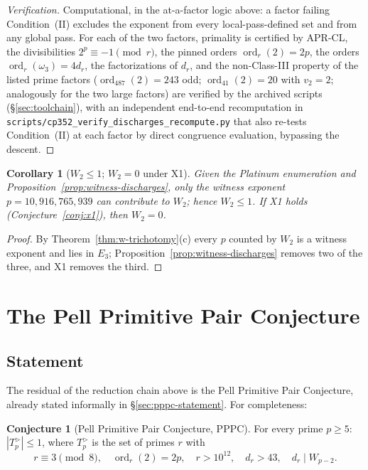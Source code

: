 \documentclass[11pt]{amsart}
\theoremstyle{plain}
\newtheorem{corollary}[theorem]{Corollary}
\theoremstyle{definition}
\newtheorem{conjecture}[theorem]{Conjecture}
\theoremstyle{remark}
\numberwithin{equation}{section}
\newcommand{\ord}{\operatorname{ord}}
\begin{document}
\begin{proof}[Verification]
Computational, in the at-a-factor logic above: a factor failing Condition~(II) excludes the exponent from every local-pass-defined set and from any global pass. For each of the two factors, primality is certified by APR-CL, the divisibilities $2^p \equiv -1 \pmod r$, the pinned orders $\ord_r(2) = 2p$, the orders $\ord_r(\omega_3) = 4 d_r$, the factorizations of $d_r$, and the non-Class-III property of the listed prime factors ($\ord_{487}(2) = 243$ odd; $\ord_{41}(2) = 20$ with $v_2 = 2$; analogously for the two large factors) are verified by the archived scripts (\S\ref{sec:toolchain}), with an independent end-to-end recomputation in \texttt{scripts/cp352\_verify\_discharges\_recompute.py} that also re-tests Condition~(II) at each factor by direct congruence evaluation, bypassing the descent.
\end{proof}

\begin{corollary}[$W_2 \leq 1$; $W_2 = 0$ under X1]\label{cor:w2-bound}
Given the Platinum enumeration and Proposition~\ref{prop:witness-discharges}, only the witness exponent $p = 10{,}916{,}765{,}939$ can contribute to $W_2$; hence $W_2 \leq 1$. If X1 holds (Conjecture~\ref{conj:x1}), then $W_2 = 0$.
\end{corollary}

\begin{proof}
By Theorem~\ref{thm:w-trichotomy}(c) every $p$ counted by $W_2$ is a witness exponent and lies in $E_3$; Proposition~\ref{prop:witness-discharges} removes two of the three, and X1 removes the third.
\end{proof}

\section{The Pell Primitive Pair Conjecture}\label{sec:pppc}

\subsection{Statement}

The residual of the reduction chain above is the Pell Primitive Pair Conjecture, already stated informally in \S\ref{sec:pppc-statement}. For completeness:

\begin{conjecture}[Pell Primitive Pair Conjecture, PPPC]\label{conj:pppc}
For every prime $p \geq 5$: $|T_p^{>}| \leq 1$, where $T_p^{>}$ is the set of primes $r$ with
\[
  r \equiv 3 \pmod 8,\quad \ord_r(2) = 2 p,\quad r > 10^{12},\quad d_r > 43,\quad d_r \mid W_{p-2}.
\]
\end{conjecture}
\end{document}
